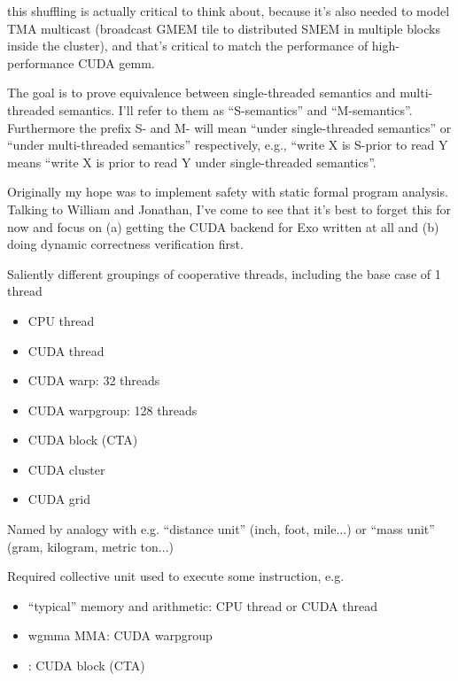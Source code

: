 \filbreak
{} this shuffling is actually critical to think about, because it's also needed to model TMA multicast (broadcast GMEM tile to distributed SMEM in multiple blocks inside the cluster), and that's critical to match the performance of high-performance CUDA gemm.

\newpage
{}

The goal is to prove equivalence between single-threaded semantics and multi-threaded semantics.
I'll refer to them as ``S-semantics'' and ``M-semantics''.
Furthermore the prefix S- and M- will mean ``under single-threaded semantics'' or ``under multi-threaded semantics'' respectively, e.g., ``write X is S-prior to read Y means ``write X is prior to read Y under single-threaded semantics''.

Originally my hope was to implement safety with static formal program analysis.
Talking to William and Jonathan, I've come to see that it's best to forget this for now and focus on (a) getting the CUDA backend for Exo written at all and (b) doing dynamic correctness verification first.

\filbreak
{}

\filbreak
{} Saliently different groupings of cooperative threads, including the base case of 1 thread
\begin{itemize}
  \item CPU thread
  \item CUDA thread
  \item CUDA warp: 32 threads
  \item CUDA warpgroup: 128 threads
  \item CUDA block (CTA)
  \item CUDA cluster
  \item CUDA grid
\end{itemize}
Named by analogy with e.g. ``distance unit'' (inch, foot, mile...) or ``mass unit'' (gram, kilogram, metric ton...)

\filbreak
{} Required collective unit used to execute some instruction, e.g.
\begin{itemize}
  \item ``typical'' memory and arithmetic: CPU thread or CUDA thread
  \item wgmma MMA: CUDA warpgroup
  \item {}: CUDA block (CTA)
\end{itemize}

